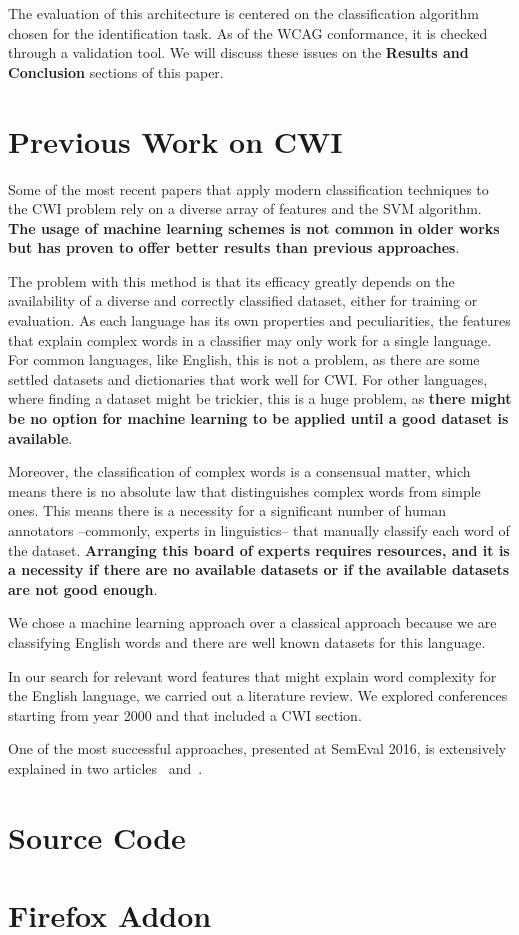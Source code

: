 \documentclass[11pt,a4paper]{article}
\begin{document}
The evaluation of this architecture is centered on the classification algorithm chosen for the identification task. As of the WCAG conformance, it is checked through a validation tool. We will discuss these issues on the \textbf{Results and Conclusion} sections of this paper.

\section{Previous Work on CWI}

Some of the most recent papers that apply modern classification techniques to the CWI problem rely on a diverse array of features and the SVM algorithm. \textbf{The usage of machine learning schemes is not common in older works but has proven to offer better results than previous approaches}.

The problem with this method is that its efficacy greatly depends on the availability of a diverse and correctly classified dataset, either for training or evaluation. As each language has its own properties and peculiarities, the features that explain complex words in a classifier may only work for a single language. For common languages, like English, this is not a problem, as there are some settled datasets and dictionaries that work well for CWI. For other languages, where finding a dataset might be trickier, this is a huge problem, as \textbf{there might be no option for machine learning to be applied until a good dataset is available}.

Moreover, the classification of complex words is a consensual matter, which means there is no absolute law that distinguishes complex words from simple ones. This means there is a necessity for a significant number of human annotators –commonly, experts in linguistics– that manually classify each word of the dataset. \textbf{Arranging this board of experts requires resources, and it is a necessity if there are no available datasets or if the available datasets are not good enough}.

We chose a machine learning approach over a classical approach because we are classifying English words and there are well known datasets for this language.

In our search for relevant word features that might explain word complexity for the English language, we carried out a literature review. We explored conferences starting from year 2000 and that included a CWI section.

One of the most successful approaches, presented at SemEval 2016, is extensively explained in two articles~\cite{paetzold2016semeval} and~\cite{paetzold2016sv000gg}.




\appendix

\section{Source Code}

\section{Firefox Addon}
\end{document}
